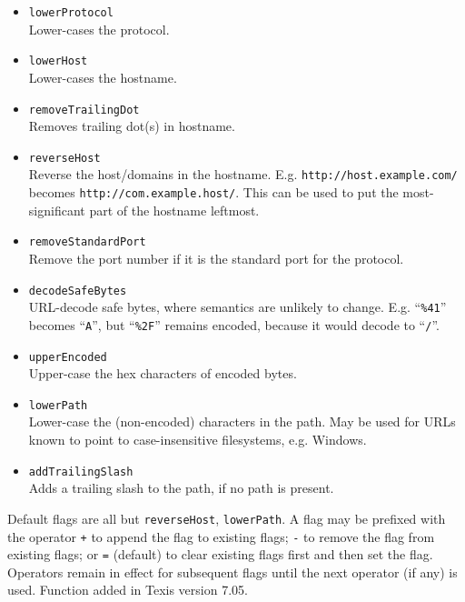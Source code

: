 \begin{itemize}

  \item \verb`lowerProtocol` \\

    Lower-cases the protocol.

  \item \verb`lowerHost` \\

    Lower-cases the hostname.

  \item \verb`removeTrailingDot` \\

    Removes trailing dot(s) in hostname.

  \item \verb`reverseHost` \\

    Reverse the host/domains in the hostname.  E.g.
    {\tt http://host.example.com/} becomes
    {\tt http://com.example.host/}.  This can be used to put the
    most-significant part of the hostname leftmost.

  \item \verb`removeStandardPort` \\

    Remove the port number if it is the standard port for the protocol.

  \item \verb`decodeSafeBytes` \\

    URL-decode safe bytes, where semantics are unlikely to change.
    E.g. ``\verb`%41`'' becomes ``\verb`A`'', but ``\verb`%2F`''
    remains encoded, because it would decode to ``\verb`/`''.

  \item \verb`upperEncoded` \\

    Upper-case the hex characters of encoded bytes.

  \item \verb`lowerPath` \\

    Lower-case the (non-encoded) characters in the path.  May be used
    for URLs known to point to case-insensitive filesystems,
    e.g. Windows.

  \item \verb`addTrailingSlash` \\

    Adds a trailing slash to the path, if no path is present.

\end{itemize}

Default flags are all but \verb`reverseHost`, \verb`lowerPath`.  A
flag may be prefixed with the operator \verb`+` to append the flag to
existing flags; \verb`-` to remove the flag from existing flags; or
\verb`=` (default) to clear existing flags first and then set the
flag.  Operators remain in effect for subsequent flags until the next
operator (if any) is used.  Function added in Texis version 7.05.

